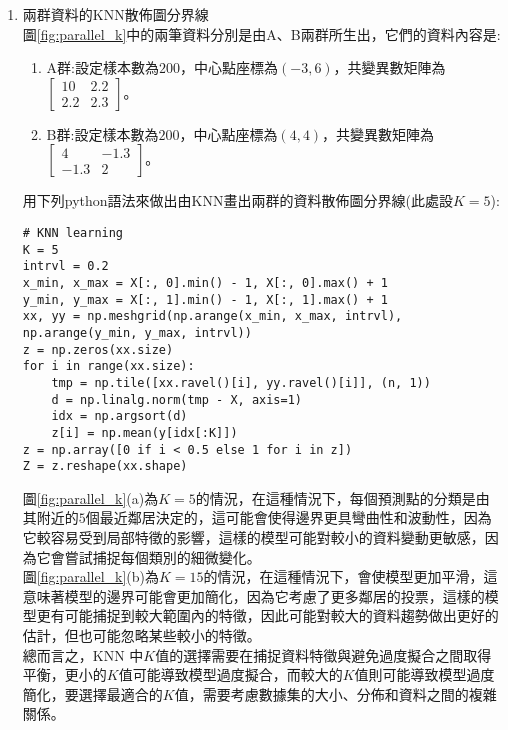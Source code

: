 \documentclass[12pt, a4paper]{article}
\begin{document}
\begin{enumerate}
\item 兩群資料的KNN散佈圖分界線\\
圖\;\ref{fig:parallel_k}\;中的兩筆資料分別是由A、B兩群所生出，它們的資料內容是\;:
\begin{enumerate}
\item A群\;:\;設定樣本數為\;$200$\;，中心點座標為\;$(-3,6)$\;，共變異數矩陣為\;$\begin{bmatrix}10 & 2.2 \\2.2 & 2.3 \end{bmatrix}$\;。
\item B群\;:\;設定樣本數為\;$200$\;，中心點座標為\;$(4,4)$\;，共變異數矩陣為\;$\begin{bmatrix}4 & -1.3 \\-1.3 & 2 \end{bmatrix}$\;。
\end{enumerate}

用下列python語法來做出由KNN畫出兩群的資料散佈圖分界線(此處設\;$K=5$\;)\;:
\begin{lstlisting}
# KNN learning
K = 5
intrvl = 0.2  
x_min, x_max = X[:, 0].min() - 1, X[:, 0].max() + 1
y_min, y_max = X[:, 1].min() - 1, X[:, 1].max() + 1
xx, yy = np.meshgrid(np.arange(x_min, x_max, intrvl), np.arange(y_min, y_max, intrvl))
z = np.zeros(xx.size)  
for i in range(xx.size):
    tmp = np.tile([xx.ravel()[i], yy.ravel()[i]], (n, 1))
    d = np.linalg.norm(tmp - X, axis=1)  
    idx = np.argsort(d)  
    z[i] = np.mean(y[idx[:K]]) 
z = np.array([0 if i < 0.5 else 1 for i in z])  
Z = z.reshape(xx.shape)
\end{lstlisting}

圖\;\ref{fig:parallel_k}\;(a)\;為\;$K=5$\;的情況，在這種情況下，每個預測點的分類是由其附近的\;$5$\;個最近鄰居決定的，這可能會使得邊界更具彎曲性和波動性，因為它較容易受到局部特徵的影響，這樣的模型可能對較小的資料變動更敏感，因為它會嘗試捕捉每個類別的細微變化。\\
圖\;\ref{fig:parallel_k}\;(b)\;為\;$K=15$\;的情況，在這種情況下，會使模型更加平滑，這意味著模型的邊界可能會更加簡化，因為它考慮了更多鄰居的投票，這樣的模型更有可能捕捉到較大範圍內的特徵，因此可能對較大的資料趨勢做出更好的估計，但也可能忽略某些較小的特徵。\\
總而言之，KNN 中\;$K$\;值的選擇需要在捕捉資料特徵與避免過度擬合之間取得平衡，更小的\;$K$\;值可能導致模型過度擬合，而較大的\;$K$\;值則可能導致模型過度簡化，要選擇最適合的\;$K$\;值，需要考慮數據集的大小、分佈和資料之間的複雜關係。


\end{enumerate}
\end{document}
